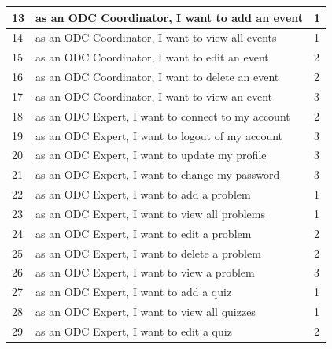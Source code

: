 \begin{longtable}{|l|l|l|}
      13                     & as an ODC Coordinator, I want to add an event            & 1                 \\ \hline
      14                     & as an ODC Coordinator, I want to view all events         & 1                 \\ \hline
      15                     & as an ODC Coordinator, I want to edit an event           & 2                 \\ \hline
      16                     & as an ODC Coordinator, I want to delete an event         & 2                 \\ \hline
      17                     & as an ODC Coordinator, I want to view an event           & 3                 \\ \hline
      18                     & as an ODC Expert, I want to connect to my account        & 2                 \\ \hline
      19                     & as an ODC Expert, I want to logout of my account         & 3                 \\ \hline
      20                     & as an ODC Expert, I want to update my profile            & 3                 \\ \hline
      21                     & as an ODC Expert, I want to change my password           & 3                 \\ \hline
      22                     & as an ODC Expert, I want to add a problem                & 1                 \\ \hline
      23                     & as an ODC Expert, I want to view all problems            & 1                 \\ \hline
      24                     & as an ODC Expert, I want to edit a problem               & 2                 \\ \hline
      25                     & as an ODC Expert, I want to delete a problem             & 2                 \\ \hline
      26                     & as an ODC Expert, I want to view a problem               & 3                 \\ \hline
      27                     & as an ODC Expert, I want to add a quiz                   & 1                 \\ \hline
      28                     & as an ODC Expert, I want to view all quizzes             & 1                 \\ \hline
      29                     & as an ODC Expert, I want to edit a quiz                  & 2                 \\ \hline

\end{longtable}
